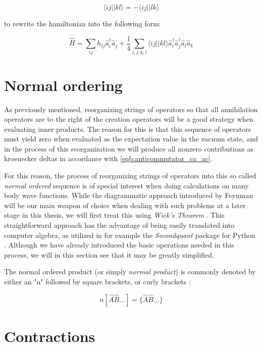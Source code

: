 $$ \langle ij \vert \vert kl \rangle =  -\langle ij \vert \vert lk \rangle$$

to rewrite the hamiltonian into the following form:

\begin{equation}
\hat{H} = \sum_{ij} h_{ij} \hat{a}_i^{\dagger} \hat{a}_j + \frac{1}{4} \sum_{i,j,k,l} \langle ij \vert \vert kl \rangle \hat{a}_{i}^{\dagger}\hat{a}_{j}^{\dagger} \hat{a}_{l} \hat{a}_k
\label{eqn:2nq_hamiltonian}
\end{equation}

\section{Normal ordering}

As previously mentioned, reorganizing strings of operators so that all annihilation operators are to the right of the creation operators will be a good strategy when evaluating inner products. The reason for this is that this sequence of operators must yield zero when evaluated as the expectation value in the vacuum state, and in the process of this reorganization we will produce all nonzero contributions as kroenecker deltas in accordance with \ref{eqb:anticommutator_ca_ac}. 

For this reason, the process of reorganizing strings of operators into this so called \emph{normal ordered} sequence is of special interest when doing calculations on many body wave functions. While the diagrammatic approach introduced by Feynman \cite{ShavittBartlett2009} will be our main weapon of choice when dealing with such problems at a later stage in this thesis, we will first treat this using \emph{Wick's Theorem} \cite{Wick1950}. This straightforward approach has the advantage of being easily translated into computer algebra, as utilized in for example the \emph{Secondquant} package for Python \cite{secondquant}. Although we have already introduced the basic operations needed in this process, we will in this section see that it may be greatly simplified.

The normal ordered product (or simply \emph{normal product}) is commonly denoted by either an "n" followed by square brackets, or curly brackets \cite{ShavittBartlett2009}:

\begin{equation}
n[\hat{A} \hat{B} ...] = \{\hat{A} \hat{B}...  \}
\label{eqn:2nq_hamiltonian}
\end{equation}

\section{Contractions}

